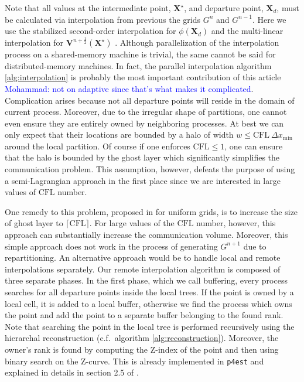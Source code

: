 Note that all values at the intermediate point, $\mathbf{X}^\star$, and departure point, $\mathbf{X}_d$, must be calculated via interpolation from previous the grids $G^{n}$ and $G^{n-1}$. Here we use the stabilized second-order interpolation for $\phi(\mathbf{X}_d)$ and the multi-linear interpolation for $\mathbf{V}^{n+\frac{1}{2}}(\mathbf{X}^\star)$ \cite{Min;Gibou:07:A-second-order-accur}. Although parallelization of the interpolation process on a shared-memory machine is trivial, the same cannot be said for distributed-memory machines. In fact, the parallel interpolation algorithm \ref{alg:interpolation} is probably the most important contribution of this article  \textcolor{blue}{Mohammad: not on adaptive since that's what makes it complicated}. Complication arises because not all departure points will reside in the domain of current process. Moreover, due to the irregular shape of partitions, one cannot even ensure they are entirely owned by neighboring processes. At best we can only expect that their locations are bounded by a halo of width $w \le \text{CFL} \: \Delta x_{\min}$ around the local partition. Of course if one enforces $\text{CFL} \le 1$, one can ensure that the halo is bounded by the ghost layer which significantly simplifies the communication problem. This assumption, however, defeats the purpose of using a semi-Lagrangian approach in the first place since we are interested in large values of $\text{CFL}$ number.

One remedy to this problem, proposed in \cite{Thomas;Cote:95:Massively-parallel-s} for uniform grids, is to increase the size of ghost layer to $\lceil \text{CFL} \rceil$. For large values of the $\text{CFL}$ number, however, this approach can substantially increase the communication volume. Moreover, this simple approach does not work in the process of generating $G^{n+1}$ due to repartitioning. An alternative approach would be to handle local and remote interpolations separately. Our remote interpolation algorithm is composed of three separate phases. In the first phase, which we call buffering, every process searches for all departure points inside the local trees. If the point is owned by a local cell, it is added to a local buffer, otherwise we find the process which owns the point and add the point to a separate buffer belonging to the found rank. Note that searching the point in the local tree is performed recursively using the hierarchal reconstruction (c.f.\ algorithm \ref{alg:reconstruction}). Moreover, the owner's rank is found by computing the Z-index of the point and then using binary search on the Z-curve. This is already implemented in \texttt{p4est} and explained in details in section 2.5 of \cite{Burstedde;Wilcox;Ghattas:11:p4est:-Scalable-Algo}.


